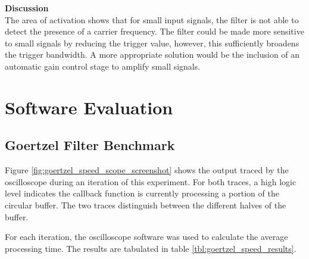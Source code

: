 \textbf{Discussion}\\
The area of activation shows that for small input signals, the filter is not able to detect the presence of a carrier frequency. The filter could be made more sensitive to small signals by reducing the trigger value, however, this sufficiently broadens the trigger bandwidth. A more appropriate solution would be the inclusion of an automatic gain control stage to amplify small signals.








\section{Software Evaluation}


\subsection{Goertzel Filter Benchmark}

Figure \ref{fig:goertzel_speed_scope_screenshot} shows the output traced by the oscilloscope during an iteration of this experiment. For both traces, a high logic level indicates the callback function is currently processing a portion of the circular buffer. The two traces distinguish between the different halves of the buffer.

For each iteration, the oscilloscope software was used to calculate the average processing time. The results are tabulated in table \ref{tbl:goertzel_speed_results}.

